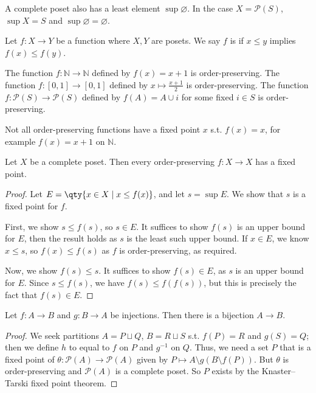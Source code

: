 A complete poset also has a least element $\sup \varnothing$.
In the case $X = \mathcal P(S)$, $\sup X = S$ and $\sup \varnothing = \varnothing$.
\begin{definition}
    Let $f \colon X \to Y$ be a function where $X, Y$ are posets.
    We say $f$ is  if $x \leq y$ implies $f(x) \leq f(y)$.
\end{definition}
\begin{example}
    The function $f \colon \mathbb N \to \mathbb N$ defined by $f(x) = x + 1$ is order-preserving.
    The function $f \colon [0,1] \to [0,1]$ defined by $x \mapsto \frac{x+1}{2}$ is order-preserving.
    The function $f \colon \mathcal P(S) \to \mathcal P(S)$ defined by $f(A) = A \cup \qty{i}$ for some fixed $i \in S$ is order-preserving.
\end{example}
Not all order-preserving functions have a fixed point $x$ s.t. $f(x) = x$, for example $f(x) = x + 1$ on $\mathbb N$.
\begin{theorem}
    Let $X$ be a complete poset.
    Then every order-preserving $f \colon X \to X$ has a fixed point.
\end{theorem}
\begin{proof}
    Let $E = \qty{x \in X \mid x \leq f(x)}$, and let $s = \sup E$.
    We show that $s$ is a fixed point for $f$.

    First, we show $s \leq f(s)$, so $s \in E$.
    It suffices to show $f(s)$ is an upper bound for $E$, then the result holds as $s$ is the least such upper bound.
    If $x \in E$, we know $x \leq s$, so $f(x) \leq f(s)$ as $f$ is order-preserving, as required.

    Now, we show $f(s) \leq s$.
    It suffices to show $f(s) \in E$, as $s$ is an upper bound for $E$.
    Since $s \leq f(s)$, we have $f(s) \leq f(f(s))$, but this is precisely the fact that $f(s) \in E$.
\end{proof}
\begin{corollary}
    Let $f \colon A \to B$ and $g \colon B \to A$ be injections.
    Then there is a bijection $A \to B$.
\end{corollary}
\begin{proof}
    We seek partitions $A = P \sqcup Q$, $B = R \sqcup S$ s.t. $f(P) = R$ and $g(S) = Q$; then we define $h$ to equal to $f$ on $P$ and $g^{-1}$ on $Q$.
    Thus, we need a set $P$ that is a fixed point of $\theta \colon \mathcal P(A) \to \mathcal P(A)$ given by $P \mapsto A \setminus g(B \setminus f(P))$.
    But $\theta$ is order-preserving and $\mathcal P(A)$ is a complete poset.
    So $P$ exists by the Knaster--Tarski fixed point theorem.
\end{proof}

